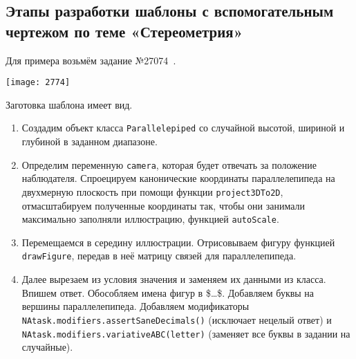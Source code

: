 \subsection{Этапы разработки шаблоны с вспомогательным чертежом по теме «Стереометрия»}

Для примера возьмём задание №27074~\cite{sdamgia}.

\texttt{[image: 2774]}

Заготовка шаблона имеет вид.



\begin{enumerate}
	\item Создадим объект класса \texttt{Parallelepiped} со случайной высотой, шириной и глубиной в заданном диапазоне. 
	
	\item Определим переменную \texttt{camera}, которая будет отвечать за положение наблюдателя. Спроецируем канонические координаты параллелепипеда на двухмерную плоскость при помощи функции \texttt{project3DTo2D}, отмасштабируем полученные координаты так, чтобы они занимали максимально заполняли иллюстрацию, функцией \texttt{autoScale}.
	
	\item Перемещаемся в середину иллюстрации. Отрисовываем фигуру функцией \texttt{drawFigure}, передав в неё матрицу связей для параллелепипеда. 
	
	\item Далее вырезаем из условия значения и заменяем их данными из класса. Впишем ответ. Обособляем имена фигур в \$\dots\$. Добавляем буквы на вершины параллелепипеда. Добавляем модификаторы          \texttt{NAtask.modifiers.assertSaneDecimals()} (исключает нецелый ответ) и
	\texttt{NAtask.modifiers.variativeABC(letter)} (заменяет все буквы в задании на случайные).
	
\end{enumerate}
